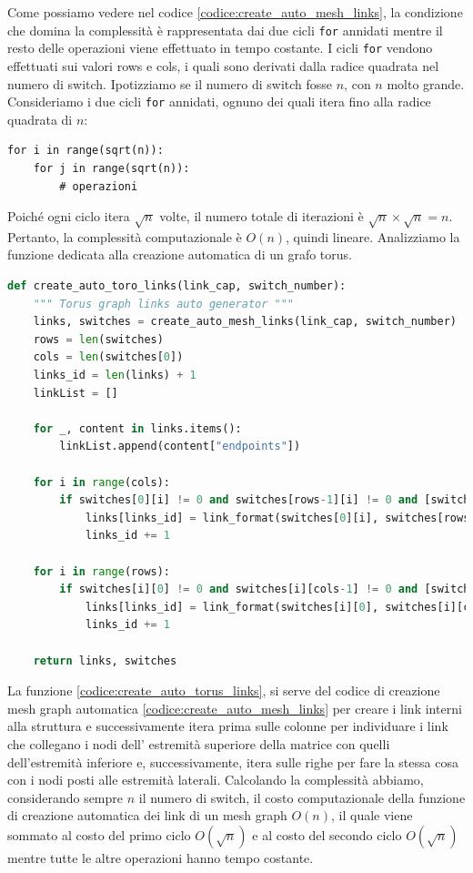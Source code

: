 \documentclass[binding=0.6cm]{sapthesis}
\begin{document}
Come possiamo vedere nel codice \ref{codice:create_auto_mesh_links}, la condizione che domina la complessità è rappresentata dai due cicli \texttt{for} annidati mentre il resto delle
operazioni viene effettuato in tempo costante. I cicli \texttt{for} vendono effettuati sui valori rows e cols, i quali sono derivati dalla radice quadrata nel numero di switch. 
Ipotizziamo se il numero di switch fosse \(n\), con \(n\) molto grande. Consideriamo i due cicli \texttt{for} annidati, 
ognuno dei quali itera fino alla radice quadrata di \( n \):
\begin{verbatim}
for i in range(sqrt(n)):
    for j in range(sqrt(n)):
        # operazioni
\end{verbatim}
Poiché ogni ciclo itera \( \sqrt{n} \) volte, il numero totale di iterazioni è \( \sqrt{n} \times \sqrt{n} = n \). Pertanto, la complessità computazionale è \( O(n) \), quindi lineare.
Analizziamo la funzione dedicata alla creazione automatica di un grafo torus.

{\scriptsize %
\begin{lstlisting}[language=Python, basicstyle=\ttfamily, caption={Funzione per la creazione automatica di un grafo torus}, label={codice:create_auto_torus_links}, breaklines=true]
    def create_auto_toro_links(link_cap, switch_number):
    """ Torus graph links auto generator """
    links, switches = create_auto_mesh_links(link_cap, switch_number)
    rows = len(switches)
    cols = len(switches[0])
    links_id = len(links) + 1
    linkList = []

    for _, content in links.items():
        linkList.append(content["endpoints"])
    
    for i in range(cols):
        if switches[0][i] != 0 and switches[rows-1][i] != 0 and [switches[0][i],switches[rows-1][i]] not in linkList:
            links[links_id] = link_format(switches[0][i], switches[rows-1][i], link_cap)
            links_id += 1

    for i in range(rows):
        if switches[i][0] != 0 and switches[i][cols-1] != 0 and [switches[i][0], switches[i][cols-1]] not in linkList:
            links[links_id] = link_format(switches[i][0], switches[i][cols-1], link_cap)
            links_id += 1

    return links, switches
\end{lstlisting}
} %

La funzione \ref{codice:create_auto_torus_links}, si serve del codice di creazione mesh graph automatica \ref{codice:create_auto_mesh_links} per 
creare i link interni alla struttura e successivamente itera prima sulle colonne per individuare i link che collegano i nodi dell' estremità superiore della matrice con quelli dell'estremità inferiore e,
successivamente, itera sulle righe per fare la stessa cosa con i nodi posti alle estremità laterali.
Calcolando la complessità abbiamo, considerando sempre \(n\) il numero di switch, il costo computazionale della funzione di creazione automatica dei link di un mesh graph \(O(n)\), il quale
viene sommato al costo del primo ciclo \(O(\sqrt{n})\) e al costo del secondo ciclo \(O(\sqrt{n})\) mentre tutte le altre operazioni hanno tempo costante.
\end{document}
